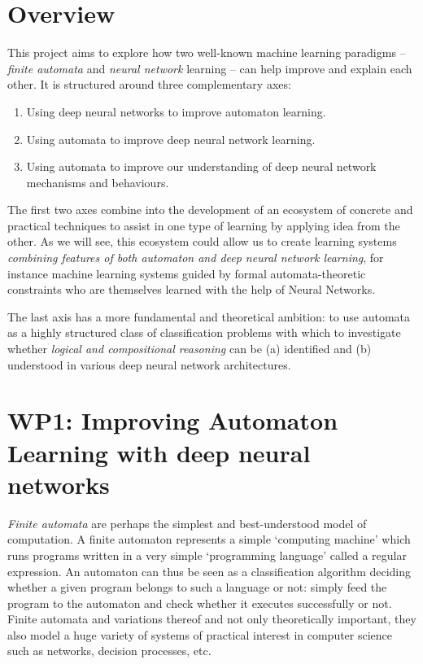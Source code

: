 \documentclass[11pt,a4paper]{article}
\begin{document}
	
	
	\section*{Overview}
	This project aims to explore how two well-known machine learning paradigms -- \emph{finite automata} and \emph{neural network} learning -- can help improve and explain each other.
	It is structured around  three complementary axes:
	\begin{enumerate}
		\item Using deep neural networks to improve automaton learning.
		\item Using automata to improve deep neural network learning.
		\item Using automata to improve our understanding of deep neural network mechanisms and behaviours.
	\end{enumerate}
	The first two axes combine into the development of an ecosystem of concrete and practical techniques to assist in one type of learning by applying idea from the other. 
	As we will see, this ecosystem could allow us to create learning systems \emph{combining features of both automaton and deep neural network learning}, for instance machine learning systems guided by formal automata-theoretic constraints who are themselves learned with the help of Neural Networks. 
	
	The last axis has a more fundamental and theoretical ambition: to use automata as a highly structured class of classification problems with which to investigate whether \emph{logical and compositional reasoning} can be (a) identified and (b) understood in various deep neural network architectures.
	
	\section*{WP1: Improving Automaton Learning with deep neural networks}
	\emph{Finite automata} are perhaps the simplest and best-understood model of computation. A finite automaton represents a simple `computing machine' which runs programs written in a very simple `programming language' called a regular expression. An automaton can thus be seen as a classification algorithm deciding whether a given program belongs to such a language or not: simply feed the program to the automaton and check whether it executes successfully or not. Finite automata and variations thereof and not only theoretically important, they also model a huge variety of systems of practical interest in computer science such as networks, decision processes, etc.
	
\end{document}
